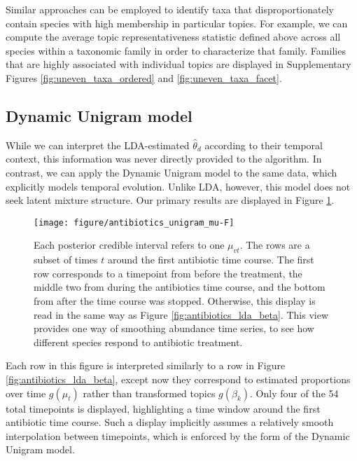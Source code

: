\documentclass{article}
\begin{document}
Similar approaches can be employed to identify taxa that disproportionately
contain species with high membership in particular topics. For example, we can
compute the average topic representativeness statistic defined above across all
species within a taxonomic family in order to characterize that family. Families
that are highly associated with individual topics are displayed in Supplementary
Figures \ref{fig:uneven_taxa_ordered} and \ref{fig:uneven_taxa_facet}.

\subsection{Dynamic Unigram model}
\label{sec:antibiotics_unigram}

While we can interpret the LDA-estimated $\hat{\theta}_{d}$ according to their
temporal context, this information was never directly provided to the algorithm.
In contrast, we can apply the Dynamic Unigram model to the same data, which
explicitly models temporal evolution. Unlike LDA, however, this model does not
seek latent mixture structure. Our primary results are displayed in Figure
\ref{fig:antibiotics_unigram_theta}.

\begin{figure}[!p]
  \centering
  \texttt{[image: figure/antibiotics\_unigram\_mu-F]}
  \caption{Each posterior credible interval refers to one $\mu_{vt}$. The rows
    are a subset of times $t$ around the first antibiotic time course. The first
    row corresponds to a timepoint from before the treatment, the middle two
    from during the antibiotics time course, and the bottom from after the time
    course was stopped. Otherwise, this display is read in the same way as
    Figure \ref{fig:antibiotics_lda_beta}. This view provides one way of
    smoothing abundance time series, to see how different species respond to
    antibiotic treatment. \label{fig:antibiotics_unigram_theta} }
\end{figure}

Each row in this figure is interpreted similarly to a row in Figure
\ref{fig:antibiotics_lda_beta}, except now they correspond to estimated
proportions over time $g\left(\mu_{t}\right)$ rather than transformed topics
$g\left(\beta_{k}\right)$. Only four of the 54 total timepoints
is displayed, highlighting a time window around the first antibiotic time
course. Such a display implicitly assumes a relatively smooth interpolation
between timepoints, which is enforced by the form of the Dynamic Unigram model.
\end{document}
